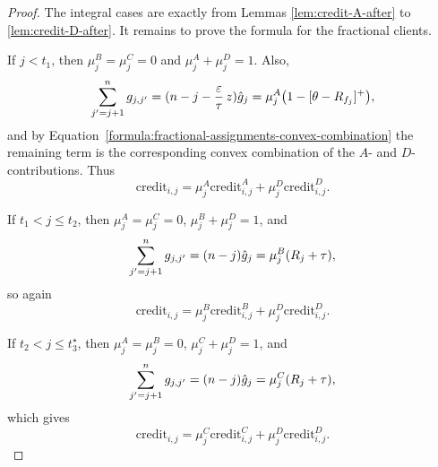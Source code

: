\begin{proof}
    The integral cases are exactly from Lemmas \ref{lem:credit-A-after} to \ref{lem:credit-D-after}. It remains to prove the formula for the fractional clients.

    If $j<t_1$, then $\mu_j^B=\mu_j^C=0$ and $\mu_j^A+\mu_j^D=1$. Also,
    \begin{equation*}
        \sum_{j'=j+1}^{n} g_{j,j'}=(n-j-\frac{\varepsilon}{\tau}\, z)\hat{g}_j=
        \mu_j^A\bigl(1-[\theta-R_{f_j}]^+\bigr),
    \end{equation*}
    and by Equation~\ref{formula:fractional-assignments-convex-combination} the remaining term is the corresponding convex combination of the $A$- and $D$-contributions. Thus
    \begin{equation*}
        \text{credit}_{i,j}=
        \mu_j^A\text{credit}_{i,j}^A+
        \mu_j^D\text{credit}_{i,j}^D.
    \end{equation*}

    If $t_1<j\le t_2$, then $\mu_j^A=\mu_j^C=0$, $\mu_j^B+\mu_j^D=1$, and
    \begin{equation*}
        \sum_{j'=j+1}^{n} g_{j,j'}=(n-j)\hat{g}_j=
        \mu_j^B(R_j+\tau),
    \end{equation*}
    so again
    \begin{equation*}
        \text{credit}_{i,j}=
        \mu_j^B\text{credit}_{i,j}^B+
        \mu_j^D\text{credit}_{i,j}^D.
    \end{equation*}

    If $t_2<j\le t_3^\star$, then $\mu_j^A=\mu_j^B=0$, $\mu_j^C+\mu_j^D=1$, and
    \begin{equation*}
        \sum_{j'=j+1}^{n} g_{j,j'}=(n-j)\hat{g}_j=
        \mu_j^C(R_j+\tau),
    \end{equation*}
    which gives
    \begin{equation*}
        \text{credit}_{i,j}=
        \mu_j^C\text{credit}_{i,j}^C+
        \mu_j^D\text{credit}_{i,j}^D.
    \end{equation*}


\end{proof}
